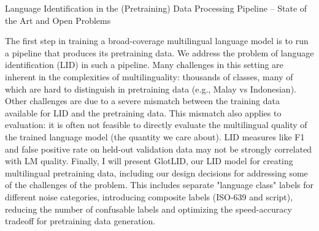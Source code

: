 Language Identification in the (Pretraining) Data Processing
Pipeline – State of the Art and Open Problems

The first step in training a broad-coverage multilingual
language model is to run a pipeline that produces its
pretraining data.  We address the problem of language
identification (LID) in such a pipeline.  Many challenges in
this setting are inherent in the complexities of
multilinguality: thousands of classes, many of which are hard
to distinguish in pretraining data (e.g., Malay vs
Indonesian).  Other challenges are due to a severe mismatch
between the training data available for LID and the
pretraining data. This mismatch also applies to evaluation:
it is often not feasible to directly evaluate the
multilingual quality of the trained language model (the
quantity we care about). LID measures like F1 and false
positive rate on held-out validation data may not be
strongly correlated with LM quality. Finally, I will present
GlotLID, our LID model for creating multilingual pretraining
data, including our design decisions for addressing some of
the challenges of the problem. This includes separate
"language class" labels for different noise categories,
introducing composite labels  (ISO-639 and script),
reducing the number of confusable labels and optimizing the
speed-accuracy tradeoff for pretraining data generation.

